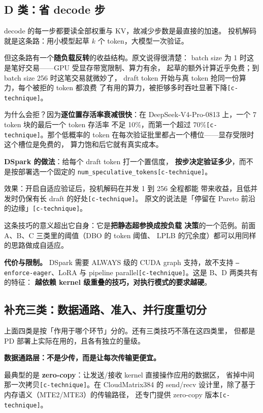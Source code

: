 \subsection{D 类：省 decode 步}

decode 的每一步都要读全部权重与 KV，故减少步数是最直接的加速。
投机解码就是这条路：用小模型起草 $k$ 个 token，大模型一次验证。

\noindent 但这条路有一个\textbf{随负载反转}的收益结构。原文说得很清楚：
batch size 为 1 时这是笔好交易——GPU 受显存带宽限制、算力有余，
起草的额外计算近乎免费；到 batch size 256 时这笔交易就微妙了，
draft token 开始与真 token 抢同一份算力，每个被拒的 token 都浪费
了有用的算力，被拒够多时吞吐显著下降\texttt{[c-technique]}。

\noindent 为什么会拒？因为\textbf{逐位置存活率衰减很快}：在
DeepSeek-V4-Pro-0813 上，一个 7 token 块的最后一个 token 存活率
不足 10\%，而第一个超过 70\%\texttt{[c-technique]}。那个低概率的
token 在每次验证批里都占一个槽位——显存受限时这个槽位是免费的，
算力饱和后它就有真实成本。

\noindent\textbf{DSpark 的做法}：给每个 draft token 打一个置信度，
\textbf{按步决定验证多少}，而不是按部署选一个固定的
\texttt{num\_speculative\_tokens}\texttt{[c-technique]}。

\noindent 效果：开启自适应验证后，投机解码在并发 1 到 256 全程都能
带来收益，且低并发时仍保有长 draft 的好处\texttt{[c-technique]}。
原文的说法是「停留在 Pareto 前沿的边缘」\texttt{[c-technique]}。

\noindent 这条技巧的意义超出它自身：它是\textbf{把静态超参换成按负载
决策}的一个范例。前面 A、B、C 三类里的阈值（DBO 的 token 阈值、
LPLB 的冗余度）都可以用同样的思路做成自适应。

\noindent\textbf{代价与限制。} DSpark 需要 ALWAYS 级的 CUDA graph
支持，故不支持 \texttt{--enforce-eager}、LoRA 与 pipeline
parallel\texttt{[c-technique]}。这是 B、D 两类共有的特征：
\textbf{越依赖 kernel 级重叠的技巧，对执行模式的要求越硬}。

\subsection{补充三类：数据通路、准入、并行度重切分}

上面四类是按「作用于哪个环节」分的。还有三类技巧不落在这四类里，
但都是 PD 部署上实际在用的，且各有独立的量级。

\noindent\textbf{ 数据通路层：不是少传，而是让每次传输更便宜。}

最典型的是 \textbf{zero-copy}：让发送/接收 kernel 直接操作应用的数据区，
省掉中间那一次拷贝\texttt{[c-technique]}。在 CloudMatrix384 的
send/recv 设计里，除了基于内存语义（MTE2/MTE3）的传输路径，
还专门提供 zero-copy 版本\texttt{[c-technique]}。

